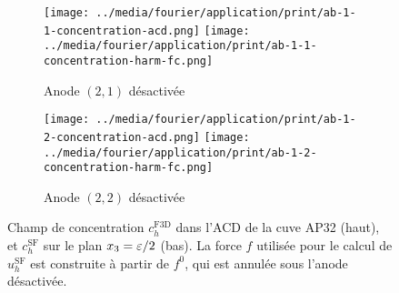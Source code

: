 \begin{figure}[h]
\begin{center}
\begin{subfigure}[t]{\textwidth}
  \texttt{[image: ../media/fourier/application/print/ab-1-1-concentration-acd.png]}
  \texttt{[image: ../media/fourier/application/print/ab-1-1-concentration-harm-fc.png]}
  \caption{Anode $(2,1)$ désactivée}
  \label{}
\end{subfigure}

\begin{subfigure}[t]{\textwidth}
  \texttt{[image: ../media/fourier/application/print/ab-1-2-concentration-acd.png]}
  \texttt{[image: ../media/fourier/application/print/ab-1-2-concentration-harm-fc.png]}
  \caption{Anode $(2,2)$ désactivée}
  \label{}
\end{subfigure}


\caption{Champ de concentration $c_h^\mathrm{F3D}$ dans l'ACD de la
  cuve AP32 (haut), et $c_h^\mathrm{SF}$ sur le plan $x_3 = \varepsilon
  / 2$ (bas). La force $f$ utilisée pour le calcul de
  $u_h^\mathrm{SF}$ est construite à partir de $f^0$, qui est annulée
  sous l'anode désactivée.}
\label{fig:harmonic-concentration-comp-fc}
\end{center}
\end{figure}
